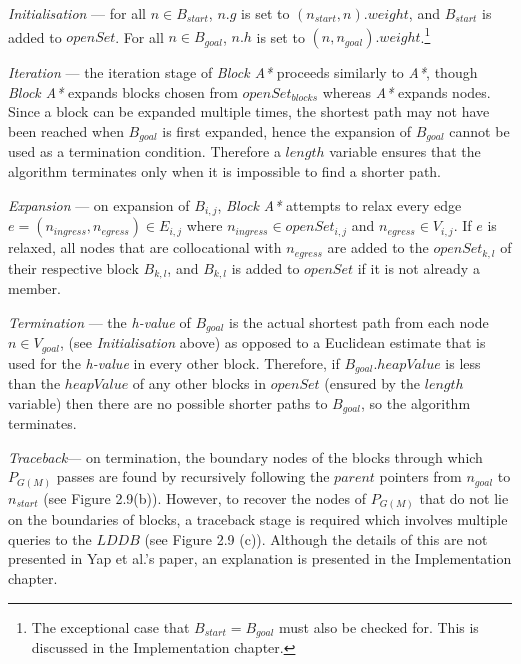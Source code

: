 \documentclass[12pt,notitlepage]{report}
\begin{document}
\begin{description}

\item[{\bfseries Algorithm walkthrough} (see Algorithm 6)]

\item{\em Initialisation} --- for all $n \in B_{start}$, $n.g$ is set to $(n_{start},n).weight$, and $B_{start}$ is added to $openSet$. For all $n \in B_{goal}$, $n.h$ is set to $(n,n_{goal}).weight$.\footnote{The exceptional case that $B_{start} = B_{goal}$ must also be checked for. This is discussed in the Implementation chapter.}\\

\item{\em Iteration} --- the iteration stage of {\em Block A*} proceeds similarly to {\em A*}, though {\em Block A*} expands blocks chosen from $openSet_{blocks}$ whereas {\em A*} expands nodes. Since a block can be expanded multiple times, the shortest path may not have been reached when $B_{goal}$ is first expanded, hence the expansion of $B_{goal}$ cannot be used as a termination condition. Therefore a $length$ variable ensures that the algorithm terminates only when it is impossible to find a shorter path.\\

\item{\em Expansion} --- on expansion of $B_{i,j}$, {\em Block A*} attempts to relax every edge $e=(n_{ingress},n_{egress}) \in E_{i,j}$ where $n_{ingress} \in openSet_{i,j}$ and $n_{egress} \in V_{i,j}$. If $e$ is relaxed, all nodes that are collocational with $n_{egress}$ are added to the $openSet_{k,l}$ of their respective block $B_{k,l}$, and $B_{k,l}$ is added to $openSet$ if it is not already a member. \\

\item{\em Termination} --- the {\em h-value} of $B_{goal}$ is the actual shortest path from each node $n \in V_{goal}$, (see {\em Initialisation} above) as opposed to a Euclidean estimate that is used for the {\em h-value} in every other block. Therefore, if $B_{goal}.heapValue$ is less than the $heapValue$ of any other blocks in $openSet$ (ensured by the $length$ variable) then there are no possible shorter paths to $B_{goal}$, so the algorithm terminates.\\

\item{\em Traceback}--- on termination, the boundary nodes of the blocks through which $P_{G(M)}$ passes are found by recursively following the $parent$ pointers from $n_{goal}$ to $n_{start}$ (see Figure 2.9(b)). However, to recover the nodes of $P_{G(M)}$ that do not lie on the boundaries of blocks, a traceback stage is required which involves multiple queries to the $LDDB$ (see Figure 2.9 (c)). Although the details of this are not presented in Yap et al.'s paper, an explanation is presented in the Implementation chapter.\\

\end{description}
\end{document}
